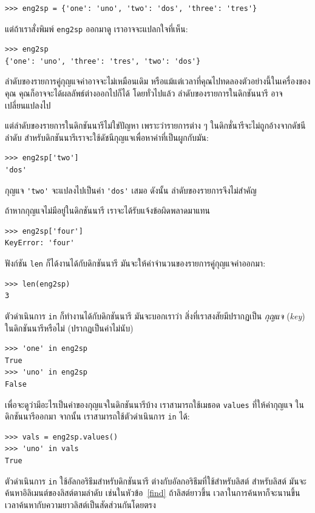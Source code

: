 \begin{verbatim}
>>> eng2sp = {'one': 'uno', 'two': 'dos', 'three': 'tres'}
\end{verbatim}
%
แต่ถ้าเราสั่งพิมพ์ \texttt{eng2sp} ออกมาดู เราอาจจะแปลกใจที่เห็น:

\begin{verbatim}
>>> eng2sp
{'one': 'uno', 'three': 'tres', 'two': 'dos'}
\end{verbatim}
%
ลำดับของรายการคู่กุญแจค่าอาจจะไม่เหมือนเดิม
หรือแม้แต่เวลาที่คุณไปทดลองตัวอย่างนี้ในเครื่องของคุณ คุณก็อาจจะได้ผลลัพธ์ต่างออกไปก็ได้
โดยทั่วไปแล้ว ลำดับของรายการในดิกชันนารี อาจเปลี่ยนแปลงไป

แต่ลำดับของรายการในดิกชันนารีไม่ใช่ปัญหา 
เพราะว่ารายการต่าง ๆ ในดิกชั่นารีจะไม่ถูกอ้างจากดัชนีลำดับ
สำหรับดิกชันนารีเราจะใช้ดัชนีกุญแจเพื่อหาค่าที่เป็นผูกกับมัน:

\begin{verbatim}
>>> eng2sp['two']
'dos'
\end{verbatim}
%
กุญแจ \verb|'two'| จะแปลงไปเป็นค่า \verb|'dos'| เสมอ
ดังนั้น ลำดับของรายการจึงไม่สำคัญ

ถ้าหากกุญแจไม่มีอยู่ในดิกชันนารี เราจะได้รับแจ้งข้อผิดพลาดมาแทน

\begin{verbatim}
>>> eng2sp['four']
KeyError: 'four'
\end{verbatim}
%
ฟังก์ชัน \texttt{len} ก็ได้งานได้กับดิกชันนารี
มันจะให้ค่าจำนวนของรายการคู่กุญแจค่าออกมา:

\begin{verbatim}
>>> len(eng2sp)
3
\end{verbatim}
%
ตัวดำเนินการ \texttt{in} ก็ทำงานได้กับดิกชันนารี
มันจะบอกเราว่า สิ่งที่เราสงสัยมีปรากฏเป็น \emph{กุญแจ} (\emph{key}) ในดิกชันนารีหรือไม่ (ปรากฏเป็นค่าไม่นับ)

\begin{verbatim}
>>> 'one' in eng2sp
True
>>> 'uno' in eng2sp
False
\end{verbatim}
%
เพื่อจะดูว่ามีอะไรเป็นค่าของกุญแจในดิกชันนารีบ้าง
เราสามารถใช้เมธอด \texttt{values} ที่ให้ค่ากุญแจ ในดิกชันนารีออกมา
จากนั้น เราสามารถใช้ตัวดำเนินการ \texttt{in} ได้:

\begin{verbatim}
>>> vals = eng2sp.values()
>>> 'uno' in vals
True
\end{verbatim}
%
ตัวดำเนินการ \texttt{in} ใช้อัลกอริธึมสำหรับดิกชันนารี ต่างกับอัลกอริธึมที่ใช้สำหรับลิสต์
สำหรับลิสต์ มันจะค้นหาอิลิเมนต์ของลิสต์ตามลำดับ เช่นในหัวข้อ~\ref{find}
ถ้าลิสต์ยาวขึ้น เวลาในการค้นหาก็จะนานขึ้น เวลาค้นหากับความยาวลิสต์เป็นสัดส่วนกันโดยตรง

